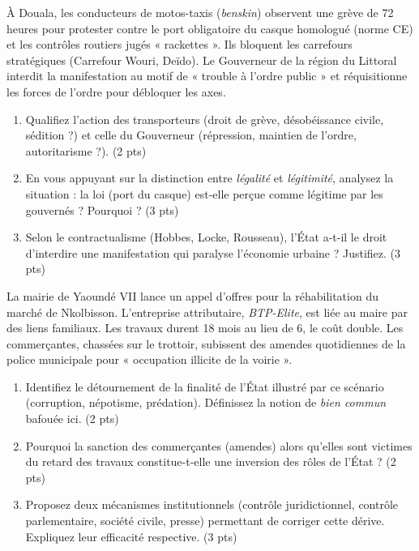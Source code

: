 \documentclass[11pt]{article}
\begin{document}
\begin{exercice}
À Douala, les conducteurs de motos-taxis (\textit{benskin}) observent une grève de 72 heures pour protester contre le port obligatoire du casque homologué (norme CE) et les contrôles routiers jugés « rackettes ». Ils bloquent les carrefours stratégiques (Carrefour Wouri, Deïdo). Le Gouverneur de la région du Littoral interdit la manifestation au motif de « trouble à l'ordre public » et réquisitionne les forces de l'ordre pour débloquer les axes.
\begin{enumerate}
    \item Qualifiez l'action des transporteurs (droit de grève, désobéissance civile, sédition ?) et celle du Gouverneur (répression, maintien de l'ordre, autoritarisme ?). (2 pts)
    \item En vous appuyant sur la distinction entre \textit{légalité} et \textit{légitimité}, analysez la situation : la loi (port du casque) est-elle perçue comme légitime par les gouvernés ? Pourquoi ? (3 pts)
    \item Selon le contractualisme (Hobbes, Locke, Rousseau), l'État a-t-il le droit d'interdire une manifestation qui paralyse l'économie urbaine ? Justifiez. (3 pts)
\end{enumerate}
\end{exercice}

\begin{exercice}
La mairie de Yaoundé VII lance un appel d'offres pour la réhabilitation du marché de Nkolbisson. L'entreprise attributaire, \textit{BTP-Elite}, est liée au maire par des liens familiaux. Les travaux durent 18 mois au lieu de 6, le coût double. Les commerçantes, chassées sur le trottoir, subissent des amendes quotidiennes de la police municipale pour « occupation illicite de la voirie ».
\begin{enumerate}
    \item Identifiez le détournement de la finalité de l'État illustré par ce scénario (corruption, népotisme, prédation). Définissez la notion de \textit{bien commun} bafouée ici. (2 pts)
    \item Pourquoi la sanction des commerçantes (amendes) alors qu'elles sont victimes du retard des travaux constitue-t-elle une inversion des rôles de l'État ? (2 pts)
    \item Proposez deux mécanismes institutionnels (contrôle juridictionnel, contrôle parlementaire, société civile, presse) permettant de corriger cette dérive. Expliquez leur efficacité respective. (3 pts)
\end{enumerate}
\end{exercice}
\end{document}
